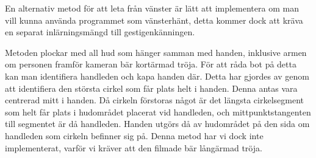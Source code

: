 En alternativ metod för att leta från
vänster är lätt att implementera om man vill kunna använda programmet
som vänsterhänt, detta kommer dock att kräva en
separat inlärningsmängd till gestigenkänningen.

Metoden plockar med all hud som hänger samman med
handen, inklusive armen om personen framför kameran bär kortärmad tröja. För att
råda bot på detta kan man identifiera handleden och kapa handen
där. Detta har gjordes av  genom att identifiera den största cirkel
som får plats helt i handen. Denna antas vara centrerad mitt i handen. Då
cirkeln förstoras något är det längsta cirkelsegment som helt får
plats i hudområdet placerat vid handleden, och mittpunktstangenten
till segmentet är då handleden. Handen utgörs då av hudområdet på den
sida om handleden som cirkeln befinner sig på. Denna metod har vi dock
inte implementerat, varför vi kräver att den filmade bär
långärmad tröja. 
